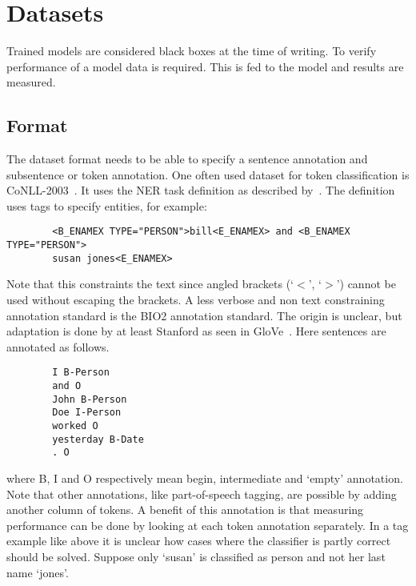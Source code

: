 \section{Datasets}
\label{sec:datasets}
Trained models are considered black boxes at the time of writing.
To verify performance of a model data is required.
This is fed to the model and results are measured.

\subsection{Format}
\label{subsec:format}
The dataset format needs to be able to specify a sentence annotation and subsentence or token annotation.
One often used dataset for token classification is CoNLL-2003~\citep{tjong2003}.
It uses the NER task definition as described by~\citet{chinchor1999}.
The definition uses tags to specify entities, for example:
\begin{center}
    \begin{verbatim}
        <B_ENAMEX TYPE="PERSON">bill<E_ENAMEX> and <B_ENAMEX TYPE="PERSON">
        susan jones<E_ENAMEX>
    \end{verbatim}
\end{center}
Note that this constraints the text since angled brackets (`$<$', `$>$') cannot be used without escaping the brackets.
A less verbose and non text constraining annotation standard is the BIO2 annotation standard.
The origin is unclear, but adaptation is done by at least Stanford as seen in GloVe~\citep{pennington2014}.
Here sentences are annotated as follows.
\begin{center}
    \begin{verbatim}
        I B-Person
        and O
        John B-Person
        Doe I-Person
        worked O
        yesterday B-Date
        . O
    \end{verbatim}
\end{center}
where B, I and O respectively mean begin, intermediate and `empty' annotation.
Note that other annotations, like part-of-speech tagging, are possible by adding another column of tokens.
A benefit of this annotation is that measuring performance can be done by looking at each token annotation separately.
In a tag example like above it is unclear how cases where the classifier is partly correct should be solved.
Suppose only `susan' is classified as person and not her last name `jones'.
